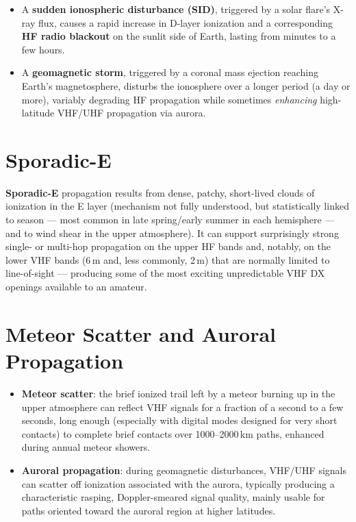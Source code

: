 \begin{itemize}
\item A \textbf{sudden ionospheric disturbance (SID)}, triggered by a
solar flare's X-ray flux, causes a rapid increase in D-layer ionization
and a corresponding \textbf{HF radio blackout} on the sunlit side of
Earth, lasting from minutes to a few hours.
\item A \textbf{geomagnetic storm}, triggered by a coronal mass
ejection reaching Earth's magnetosphere, disturbs the ionosphere over a
longer period (a day or more), variably degrading HF propagation while
sometimes \emph{enhancing} high-latitude VHF/UHF propagation via aurora.
\end{itemize}

\section{Sporadic-E}

\textbf{Sporadic-E} propagation results from dense, patchy, short-lived
clouds of ionization in the E layer (mechanism not fully understood, but
statistically linked to season --- most common in late spring/early
summer in each hemisphere --- and to wind shear in the upper
atmosphere). It can support surprisingly strong single- or
multi-hop propagation on the upper HF bands and, notably, on the lower
VHF bands (6\,m and, less commonly, 2\,m) that are normally limited to
line-of-sight --- producing some of the most exciting unpredictable
VHF DX openings available to an amateur.

\section{Meteor Scatter and Auroral Propagation}

\begin{itemize}
\item \textbf{Meteor scatter}: the brief ionized trail left by a meteor
burning up in the upper atmosphere can reflect VHF signals for a
fraction of a second to a few seconds, long enough (especially with
digital modes designed for very short contacts) to complete brief
contacts over 1000--2000\,km paths, enhanced during annual meteor
showers.
\item \textbf{Auroral propagation}: during geomagnetic disturbances,
VHF/UHF signals can scatter off ionization associated with the aurora,
typically producing a characteristic rasping, Doppler-smeared signal
quality, mainly usable for paths oriented toward the auroral region at
higher latitudes.
\end{itemize}

